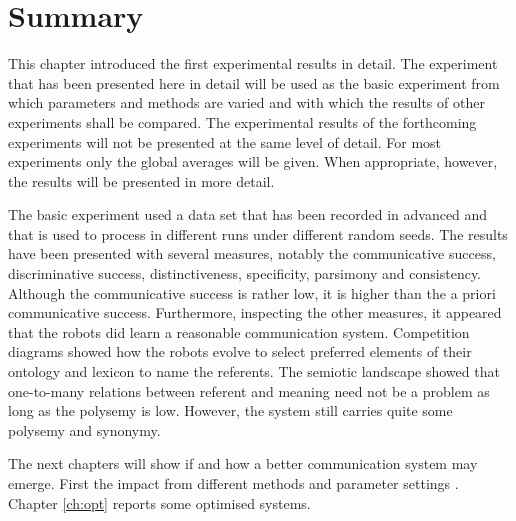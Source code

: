\section{Summary}

This chapter introduced the first experimental results in detail. The experiment that has been presented here in detail will be used as the basic experiment from which parameters and methods are varied and with which the results of other experiments shall be compared. The experimental results of the forthcoming experiments will not be presented at the same level of detail. For most experiments only the global averages will be given. When appropriate, however, the results will be presented in more detail. 

The basic experiment used a data set that has been recorded in advanced  and that is used to process in different runs under different random seeds. The results have been presented with several measures, notably the communicative success, discriminative success, distinctiveness, specificity, parsimony and consistency. Although the communicative success is rather low, it is higher than the a priori communicative success. Furthermore, inspecting the other measures, it appeared that the robots did learn a reasonable communication system. Competition diagrams showed how the robots evolve to select preferred elements of their ontology and lexicon to name the referents. The semiotic landscape showed that one-to-many relations between referent and meaning need not be a problem as long as the polysemy is low.  However, the system still carries quite some polysemy and synonymy. 

The next chapters will show if and how a better communication system may emerge. First the impact from different methods and parameter settings . Chapter \ref{ch:opt} reports some optimised systems.



